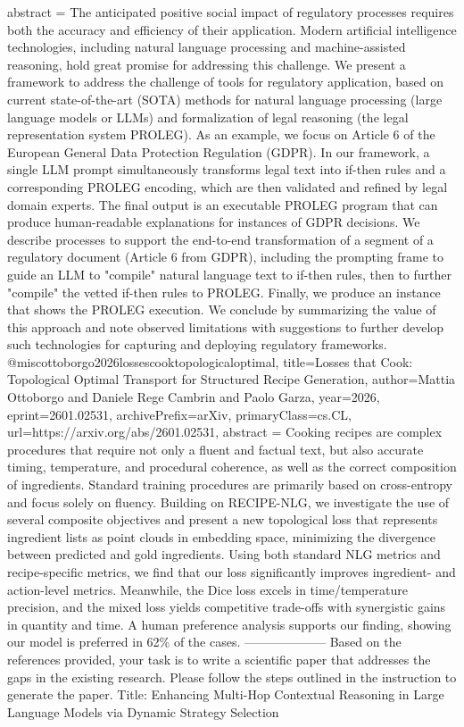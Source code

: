 {      abstract = {The anticipated positive social impact of regulatory processes requires both the accuracy and efficiency of their application. Modern artificial intelligence technologies, including natural language processing and machine-assisted reasoning, hold great promise for addressing this challenge. We present a framework to address the challenge of tools for regulatory application, based on current state-of-the-art (SOTA) methods for natural language processing (large language models or LLMs) and formalization of legal reasoning (the legal representation system PROLEG). As an example, we focus on Article 6 of the European General Data Protection Regulation (GDPR). In our framework, a single LLM prompt simultaneously transforms legal text into if-then rules and a corresponding PROLEG encoding, which are then validated and refined by legal domain experts. The final output is an executable PROLEG program that can produce human-readable explanations for instances of GDPR decisions. We describe processes to support the end-to-end transformation of a segment of a regulatory document (Article 6 from GDPR), including the prompting frame to guide an LLM to "compile" natural language text to if-then rules, then to further "compile" the vetted if-then rules to PROLEG. Finally, we produce an instance that shows the PROLEG execution. We conclude by summarizing the value of this approach and note observed limitations with suggestions to further develop such technologies for capturing and deploying regulatory frameworks.}
}@misc{ottoborgo2026lossescooktopologicaloptimal,
      title={Losses that Cook: Topological Optimal Transport for Structured Recipe Generation}, 
      author={Mattia Ottoborgo and Daniele Rege Cambrin and Paolo Garza},
      year={2026},
      eprint={2601.02531},
      archivePrefix={arXiv},
      primaryClass={cs.CL},
      url={https://arxiv.org/abs/2601.02531},
      abstract = {Cooking recipes are complex procedures that require not only a fluent and factual text, but also accurate timing, temperature, and procedural coherence, as well as the correct composition of ingredients. Standard training procedures are primarily based on cross-entropy and focus solely on fluency. Building on RECIPE-NLG, we investigate the use of several composite objectives and present a new topological loss that represents ingredient lists as point clouds in embedding space, minimizing the divergence between predicted and gold ingredients. Using both standard NLG metrics and recipe-specific metrics, we find that our loss significantly improves ingredient- and action-level metrics. Meanwhile, the Dice loss excels in time/temperature precision, and the mixed loss yields competitive trade-offs with synergistic gains in quantity and time. A human preference analysis supports our finding, showing our model is preferred in 62\% of the cases.}
}
        --------------------
         Based on the references provided, your task is to write a scientific paper that addresses the gaps in the existing research. Please follow the steps outlined in the instruction to generate the paper.
Title: Enhancing Multi-Hop Contextual Reasoning in Large Language Models via Dynamic Strategy Selection

